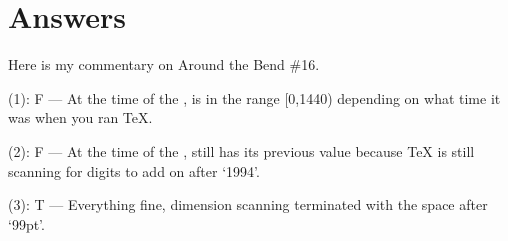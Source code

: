 \begin{comment}
************************************************************************

Answers will be posted circa January 27, 1994.

Michael Downes %
mjd@math.ams.org (Internet) ASCII 32--54,55--126: !"#$%
789:;<=>?@ABCDEFGHIJKLMNOPQRSTUVWXYZ[\]^_`abcdefghijklmnopqrstuvwxyz{|}~
\end{comment}


\section{Answers}

\begin{comment}
[There was an error in the first posted version: \twelverm instead of
the first \tenrm in the statement

  \font\tenrm = \fontname\tenrm scaled 1200

The posting containing this correction is appended below.]

Date: 27 Jan 1994 11:59:48 -0500 (EST)
From: Michael Downes <MJD@MATH.AMS.ORG>
Subject: Around the Bend #16, answers
To: info-tex@shsu.edu
X-ListName: TeX-Related Network Discussion List <INFO-TeX@SHSU.edu>
\end{comment}


Here is my commentary on Around the Bend \#16.
\begin{lcode}

\end{lcode}
(1): F --- At the time of the , \cmd{\mag} is in the range [0,1440)
depending on what time it was when you ran TeX.

\begin{lcode}
\end{lcode}
(2): F --- At the time of the , \cmd{\mag} still has its previous value
because TeX is still scanning for digits to add on after `1994'.

\begin{lcode}
\end{lcode}
(3): T --- Everything fine, dimension scanning terminated with the
space after `99pt'.

